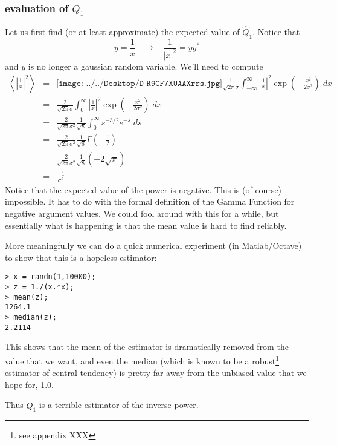 \subsubsection{evaluation of $Q_1$}

Let us first find (or at least approximate) the expected value of
$\hat{Q}_1$.   Notice that
\begin{displaymath}
y = \frac{1}{x} \;\;\; \rightarrow \;\;\; \frac{1}{|x|^2} = yy^\ast
\end{displaymath}
and $y$ is no longer a gaussian random variable.   We'll need to
compute
\begin{eqnarray}
\left\langle \left| \frac{1}{x} \right|^2 \right\rangle &=&\texttt{[image: ../../Desktop/D-R9CF7XUAAXrrs.jpg]}

\frac{1}{\sqrt{2\pi} \sigma} \int_{-\infty}^\infty
\left|\frac{1}{x}\right|^2 \exp\left(-\frac{x^2}{2\sigma^2}\right) \;
dx \\
&=& \frac{2}{\sqrt{2\pi} \sigma} \int_{0}^\infty
\left|\frac{1}{x}\right|^2 \exp\left(-\frac{x^2}{2\sigma^2}\right) \;
dx\\
&=& \frac{2}{\sqrt{2\pi} \sigma^2} \frac{1}{\sqrt{8}} \int_{0}^\infty
s^{-3/2} e^{-s} \; ds \\
&=&\frac{2}{\sqrt{2\pi} \sigma^2} \frac{1}{\sqrt{8}}
\Gamma\left(-\frac{1}{2}\right) \\
&=&\frac{2}{\sqrt{2\pi} \sigma^2} \frac{1}{\sqrt{8}}
(-2\sqrt{\pi})\\
&=& \frac{-1}{\sigma^2}
\end{eqnarray}
Notice that the expected value of the power is negative.  This is (of
course) impossible.  It has to do with the formal definition of the
Gamma Function for negative argument values.  We could fool around
with this for a while, but essentially what is happening is that the
mean value is hard to find reliably.

More meaningfully we can do a quick numerical experiment (in
Matlab/Octave) to show that this is a hopeless estimator:
\begin{verbatim}
> x = randn(1,10000);
> z = 1./(x.*x);
> mean(z);
1264.1
> median(z);
2.2114
\end{verbatim}
This shows that the mean of the estimator is dramatically removed from
the value that we want, and even the median (which is known to be a
robust\footnote{see appendix XXX} estimator of central tendency) is
pretty far away from the unbiased value that we hope for, 1.0.

Thus $\hat{Q}_1$ is a terrible estimator of the inverse power.

